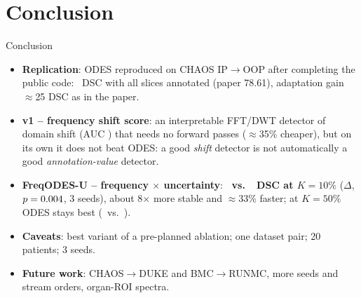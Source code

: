 \documentclass[aspectratio=169,10pt]{beamer}
\begin{document}
\section{Conclusion}
\begin{frame}{Conclusion}
  \begin{itemize}
    \item \textbf{Replication}: ODES reproduced on CHAOS IP$\rightarrow$OOP after completing the public code: \DODESK\ DSC with all slices annotated (paper 78.61), adaptation gain $\approx$25 DSC as in the paper.
    \item \textbf{v1 -- frequency shift score}: an interpretable FFT/DWT detector of domain shift (AUC \AUCFFT) that needs no forward passes ($\approx$35\% cheaper), but on its own it does not beat ODES: a good \emph{shift} detector is not automatically a good \emph{annotation-value} detector.
    \item \textbf{FreqODES-U -- frequency $\times$ uncertainty}: \textbf{\VFeTenMean\ vs.\ \VBnTenMean\ DSC at $K=10\%$} ($\Delta$\VFeTenDiff, $p=0.004$, 3 seeds), about 8$\times$ more stable and $\approx$33\% faster; at $K=50\%$ ODES stays best (\VBnFiftyMean\ vs.\ \VFeFiftyMean).
    \item \textbf{Caveats}: best variant of a pre-planned ablation; one dataset pair; 20 patients; 3 seeds.
    \item \textbf{Future work}: CHAOS$\rightarrow$DUKE and BMC$\rightarrow$RUNMC, more seeds and stream orders, organ-ROI spectra.
  \end{itemize}
\end{frame}
\end{document}
